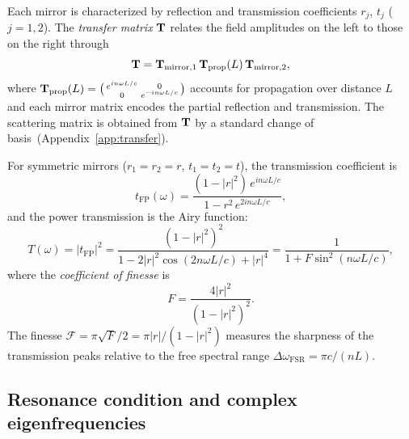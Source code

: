 Each mirror is characterized by reflection and transmission coefficients
$r_j$, $t_j$ ($j = 1,2$). The \emph{transfer matrix} $\mathbf{T}$ relates
the field amplitudes on the left to those on the right through
\begin{equation}
 \mathbf{T} = \mathbf{T}_{\mathrm{mirror},1}\,\mathbf{T}_{\mathrm{prop}}(L)\,
 \mathbf{T}_{\mathrm{mirror},2},
 \label{eq:transfer-fp}
\end{equation}
where $\mathbf{T}_{\mathrm{prop}}(L) = \bigl(\begin{smallmatrix} e^{in\omega L/c} & 0
\\ 0 & e^{-in\omega L/c}\end{smallmatrix}\bigr)$ accounts for propagation over
distance $L$ and each mirror matrix encodes the partial reflection and
transmission. The scattering matrix is obtained from $\mathbf{T}$ by a
standard change of basis~(Appendix~\ref{app:transfer}).

For symmetric mirrors ($r_1 = r_2 = r$, $t_1 = t_2 = t$), the
transmission coefficient is
\begin{equation}
 t_{\mathrm{FP}}(\omega) = \frac{(1-|r|^2)\,e^{in\omega L/c}}
 {1 - r^2\,e^{2in\omega L/c}},
 \label{eq:fp-transmission-coeff}
\end{equation}
and the power transmission is the Airy function:
\begin{equation}
 T(\omega) = |t_{\mathrm{FP}}|^2
 = \frac{(1-|r|^2)^2}
 {1 - 2|r|^2\cos(2n\omega L/c) + |r|^4}
 = \frac{1}{1 + F\sin^2(n\omega L/c)},
 \label{eq:airy}
\end{equation}
where the \emph{coefficient of finesse} is
\begin{equation}
 F = \frac{4|r|^2}{(1-|r|^2)^2}.
 \label{eq:finesse-coeff}
\end{equation}
The finesse $\mathcal{F} = \pi\sqrt{F}/2 = \pi|r|/(1-|r|^2)$
measures the sharpness of the transmission peaks relative to the free
spectral range $\Delta\omega_{\mathrm{FSR}} = \pi c/(nL)$.

\subsection{Resonance condition and complex eigenfrequencies}
\label{ssec:resonance-condition}

